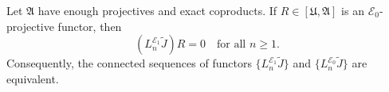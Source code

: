 Let $\mathfrak{A}$ have enough projectives and exact coproducts. If $R \in [\mathfrak{U}, \mathfrak{A}]$ is an $\mathcal{E}_0$-projective functor, then
$$
(L_n^{\mathcal{E}_1} \tilde{J}) R = 0 \quad \text{for all } n \geq 1.
$$
Consequently, the connected sequences of functors $\{L_n^{\mathcal{E}_1} \tilde{J}\}$ and $\{L_n^{\mathcal{E}_0} \tilde{J}\}$ are equivalent.
